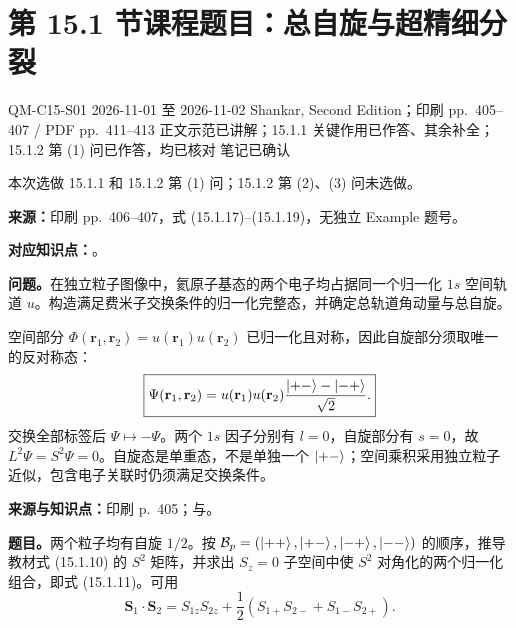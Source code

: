
\section{第 15.1 节课程题目：总自旋与超精细分裂}
\label{exercises:QM-C15-S01}
\exercisemeta
  {QM-C15-S01}
  {2026-11-01 至 2026-11-02}
  {Shankar, Second Edition；印刷 pp.~405--407 / PDF pp.~411--413}
  {正文示范已讲解；15.1.1 关键作用已作答、其余补全；15.1.2 第 (1) 问已作答，均已核对}
  {笔记已确认}

本次选做 15.1.1 和 15.1.2 第 (1) 问；15.1.2 第 (2)、(3) 问未选做。

\textbf{来源：}印刷 pp.~406--407，式 (15.1.17)--(15.1.19)，无独立 Example 题号。

\textbf{对应知识点：}。

\textbf{问题。}在独立粒子图像中，氦原子基态的两个电子均占据同一个归一化 $1s$ 空间轨道 $u$。构造满足费米子交换条件的归一化完整态，并确定总轨道角动量与总自旋。

\begin{checkedsolution}
空间部分 $\Phi(\mathbf r_1,\mathbf r_2)=u(\mathbf r_1)u(\mathbf r_2)$ 已归一化且对称，因此自旋部分须取唯一的反对称态：
\begin{equation}
  \boxed{\Psi(\mathbf r_1,\mathbf r_2)
  =u(\mathbf r_1)u(\mathbf r_2)
    \frac{\left|+-\right\rangle-\left|-+\right\rangle}{\sqrt2}.}
\end{equation}
交换全部标签后 $\Psi\mapsto-\Psi$。两个 $1s$ 因子分别有 $l=0$，自旋部分有 $s=0$，故 $L^2\Psi=S^2\Psi=0$。自旋态是单重态，不是单独一个 $\left|+-\right\rangle$；空间乘积采用独立粒子近似，包含电子关联时仍须满足交换条件。
\end{checkedsolution}

\textbf{来源与知识点：}印刷 p.~405；与。

\textbf{题目。}两个粒子均有自旋 $1/2$。按 $\mathcal B_p=(\left|++\right\rangle,\left|+-\right\rangle,\left|-+\right\rangle,\left|--\right\rangle)$ 的顺序，推导教材式 (15.1.10) 的 $S^2$ 矩阵，并求出 $S_z=0$ 子空间中使 $S^2$ 对角化的两个归一化组合，即式 (15.1.11)。可用
\begin{equation}
  \mathbf S_1\cdot\mathbf S_2
  =S_{1z}S_{2z}+\frac12(S_{1+}S_{2-}+S_{1-}S_{2+}).
\end{equation}

